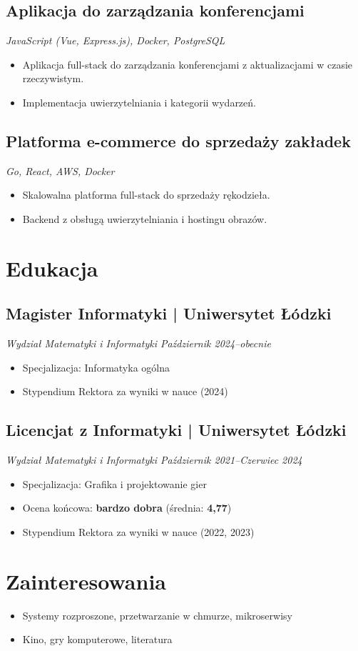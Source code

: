 \documentclass[a4paper,10pt]{article}
\begin{document}
\subsection{Aplikacja do zarządzania konferencjami}
\textit{JavaScript (Vue, Express.js), Docker, PostgreSQL}
\begin{itemize}[leftmargin=0.5cm, nosep]
    \item Aplikacja full-stack do zarządzania konferencjami z aktualizacjami w czasie rzeczywistym.
    \item Implementacja uwierzytelniania i kategorii wydarzeń.
\end{itemize}

\subsection{Platforma e-commerce do sprzedaży zakładek}
\textit{Go, React, AWS, Docker}
\begin{itemize}[leftmargin=0.5cm, nosep]
    \item Skalowalna platforma full-stack do sprzedaży rękodzieła.
    \item Backend z obsługą uwierzytelniania i hostingu obrazów.
\end{itemize}

\section{Edukacja}

\subsection{Magister Informatyki | Uniwersytet Łódzki}
\textit{Wydział Matematyki i Informatyki \hfill Październik 2024--obecnie}
\begin{itemize}[leftmargin=0.5cm, nosep]
  \item Specjalizacja: Informatyka ogólna
  \item Stypendium Rektora za wyniki w nauce (2024)
\end{itemize}

\subsection{Licencjat z Informatyki | Uniwersytet Łódzki}
\textit{Wydział Matematyki i Informatyki \hfill Październik 2021--Czerwiec 2024}
\begin{itemize}[leftmargin=0.5cm, nosep]
  \item Specjalizacja: Grafika i projektowanie gier
  \item Ocena końcowa: \textbf{bardzo dobra} (średnia: \textbf{4,77})
  \item Stypendium Rektora za wyniki w nauce (2022, 2023)
\end{itemize}

\section{Zainteresowania}

\begin{itemize}[leftmargin=0.5cm, nosep]
    \item Systemy rozproszone, przetwarzanie w chmurze, mikroserwisy
    \item Kino, gry komputerowe, literatura
\end{itemize}
\end{document}
